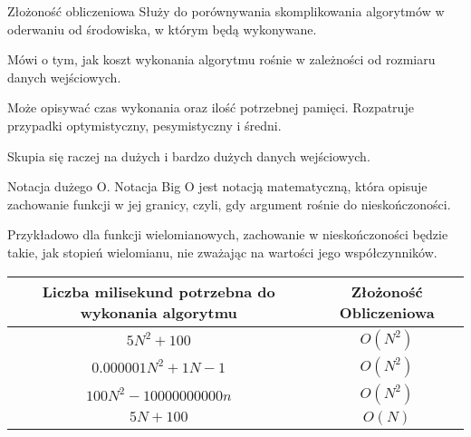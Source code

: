 \documentclass[kslide.tex]{subfiles}
\begin{document}
\begin{frame}{Złożoność obliczeniowa }
        Służy do porównywania skomplikowania algorytmów w oderwaniu od środowiska, w którym będą wykonywane.\\[0.3cm]\pause 
        
        Mówi o tym, jak koszt wykonania algorytmu rośnie w zależności od rozmiaru danych wejściowych.\\[0.3cm]\pause 
        
        Może opisywać czas wykonania oraz ilość potrzebnej pamięci. Rozpatruje przypadki optymistyczny, pesymistyczny i średni.\\[0.3cm]\pause 
        
        Skupia się raczej na dużych i bardzo dużych danych wejściowych. 
\end{frame}

\begin{frame}{Notacja dużego O.}
    Notacja Big O jest notacją matematyczną, która opisuje zachowanie funkcji w jej granicy, czyli, gdy argument rośnie do nieskończoności.\\[0.3cm]\pause 
    
    Przykładowo dla funkcji wielomianowych, zachowanie w nieskończoności będzie takie, jak stopień wielomianu, nie zważając na wartości jego współczynników.\pause 

    \begin{center}
        \begin{tabular}{ |c | c | } 
        \hline
        Liczba milisekund potrzebna do wykonania algorytmu & Złożoność Obliczeniowa \\ 
        \hline \pause 
        $5N^2 + 100$ & $O(N^2)$ \\ 
        \hline \pause
        
        $0.000001N^2 + 1N - 1$ & $O(N^2)$ \\ 
        \hline \pause
        $100N^2 - 10000000000n$ & $O(N^2)$ \\ 
        \hline \pause
        $5N + 100$ & $O(N)$ \\ 
        \hline
        \end{tabular}
    \end{center}

        
\end{frame}
\end{document}
